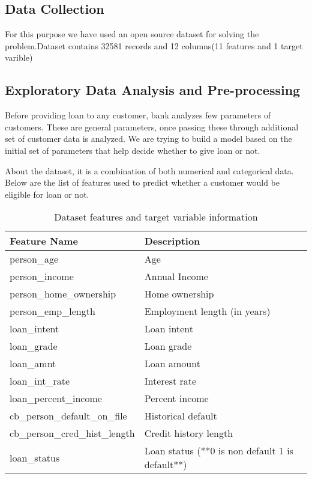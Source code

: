 \documentclass[12pt]{article}
\begin{document}
\subsection{Data Collection}

For this purpose we have used an open source dataset for solving the problem.Dataset contains 32581 records and 12 columns(11 features and 1 target varible)



\subsection{Exploratory Data Analysis and Pre-processing}
Before providing loan to any customer, bank analyzes few parameters of customers. These are general parameters, once passing these through additional set of customer data is analyzed. We are trying to build a model based on the initial set of parameters that help decide whether to give loan or not.

About the dataset, it is a combination of both numerical and categorical data. Below are the list of features used to predict whether a customer would be eligible for loan or not.



\begin{table}[!ht]
    \centering
    \begin{tabular}{|l|l|}
    \hline
        Feature Name & Description \\ \hline
        person\_age & Age \\ \hline
        person\_income & Annual Income \\ \hline
        person\_home\_ownership & Home ownership \\ \hline
        person\_emp\_length & Employment length (in years) \\ \hline
        loan\_intent & Loan intent \\ \hline
        loan\_grade & Loan grade \\ \hline
        loan\_amnt & Loan amount \\ \hline
        loan\_int\_rate & Interest rate \\ \hline
        loan\_percent\_income & Percent income \\ \hline
        cb\_person\_default\_on\_file & Historical default \\ \hline
        cb\_person\_cred\_hist\_length & Credit history length \\ \hline
        loan\_status & Loan status (**0 is non default 1 is default**) \\ \hline
    \end{tabular}
    \caption{Dataset features and target variable information}
\end{table}
\end{document}
